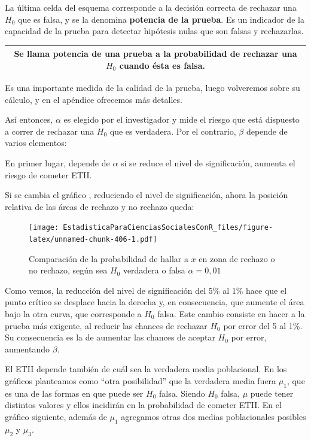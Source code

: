 \documentclass[]{book}
\begin{document}
La última celda del esquema corresponde a la decisión correcta de
rechazar una \(H_{0}\) que es falsa, y se la denomina \textbf{potencia de la prueba}. Es un indicador de la capacidad de la prueba para detectar
hipótesis nulas que son falsas y rechazarlas.

\begin{longtable}[]{@{}c@{}}
\toprule
\endhead
\begin{minipage}[t]{0.97\columnwidth}\centering
Se llama \textbf{potencia de una prueba} a la probabilidad de rechazar una \(H_{0}\) cuando ésta es falsa.\strut
\end{minipage}\tabularnewline
\bottomrule
\end{longtable}

Es una importante medida de la calidad de la prueba, luego volveremos
sobre su cálculo, y en el apéndice ofrecemos más detalles.

Así entonces, \(\alpha\) es elegido por el investigador y mide el riesgo que está dispuesto a correr de rechazar una \(H_{0}\) que es verdadera. Por el contrario, \(\beta\) depende de varios elementos:

En primer lugar, depende de \(\alpha\) si se reduce el nivel de significación, aumenta el riesgo de cometer
ETII.

Si se cambia el gráfico , reduciendo el nivel de significación, ahora la posición relativa de las áreas de rechazo y no rechazo queda:

\begin{figure}
\centering
\texttt{[image: EstadisticaParaCienciasSocialesConR\_files/figure-latex/unnamed-chunk-406-1.pdf]}
\caption{\label{fig:unnamed-chunk-406}Comparación de la probabilidad de hallar a \(\overline{x}\) en zona de rechazo o no rechazo, según sea \(H_{0}\) verdadera o falsa \(\alpha = 0,01\)}
\end{figure}

Como vemos, la reducción del nivel de significación del 5\% al 1\% hace
que el punto crítico se desplace hacia la derecha y, en consecuencia,
que aumente el área bajo la otra curva, que corresponde a \(H_{0}\) falsa.
Este cambio consiste en hacer a la prueba más exigente, al reducir las
chances de rechazar \(H_{0}\) por error del 5 al 1\%. Su consecuencia es la de aumentar las chances de aceptar \(H_{0}\) por error, aumentando \(\beta\).

El ETII depende también de cuál sea la verdadera media poblacional. En
los gráficos planteamos como ``otra posibilidad'' que la verdadera
media fuera \(\mu_{1}\), que es una de las formas en que puede ser \(H_{0}\) falsa.
Siendo \(H_{0}\) falsa, \(\mu\) puede tener distintos valores y ellos incidirán en la probabilidad de cometer ETII. En el gráfico siguiente, además de \(\mu_{1}\) agregamos otras dos medias poblacionales posibles \(\mu_{2}\) y \(\mu_{3}\).
\end{document}
